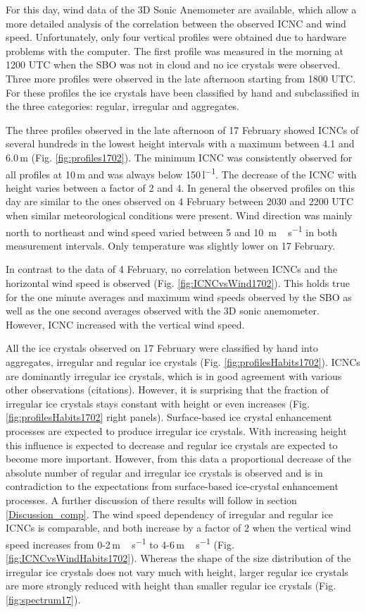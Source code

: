 \documentclass[draft,linenumbers]{agujournal}
\begin{document}
For this day, wind data of the 3D Sonic Anemometer are available, which allow a more detailed analysis of the correlation between the observed ICNC and wind speed. Unfortunately, only four vertical profiles were obtained  due to hardware problems with the computer. The first profile was measured in the morning at 1200 UTC when the SBO was not in cloud and no ice crystals were observed. Three more profiles were observed in the late afternoon starting from 1800 UTC. For these profiles the ice crystals have been classified by hand and subclassified in the three categories: regular, irregular and aggregates.

The three profiles observed in the late afternoon of 17 February showed ICNCs of several hundreds in the lowest height intervals with a maximum between 4.1 and 6.0\,\si{m} (Fig. \ref{fig:profiles1702}). The minimum ICNC was consistently observed for all profiles at 10\,\si{m} and was always below 150\,\si{l^{-1}}. The decrease of the ICNC with height varies between a factor of 2 and 4. In general the observed profiles on this day are similar to the ones observed on 4 February between 2030 and 2200 UTC when similar meteorological conditions were present. Wind direction was mainly north to northeast and wind speed varied between 5 and 10 \,\si{m\,s^{-1}} in both measurement intervals. Only temperature was slightly lower on 17 February.

In contrast to the data of 4 February, no correlation between ICNCs and the horizontal wind speed is observed (Fig. \ref{fig:ICNCvsWind1702}). This holds true for the one minute averages and maximum wind speeds observed by the SBO as well as the one second averages observed with the 3D sonic anemometer. However, ICNC increased with the vertical wind speed. 

All the ice crystals observed on 17 February were classified by hand into aggregates, irregular and regular ice crystals (Fig. \ref{fig:profilesHabits1702}). ICNCs are dominantly irregular ice crystals, which is in good agreement with various other observations (citations). However, it is surprising that the fraction of irregular ice crystals stays constant with height or even increases (Fig. \ref{fig:profilesHabits1702} right panels). Surface-based ice crystal enhancement processes are expected to produce irregular ice crystals. With increasing height this influence is expected to decrease and regular ice crystals are expected to become more important. However, from this data a proportional decrease of the absolute number of regular and irregular ice crystals is observed and is in contradiction to the expectations from surface-based ice-crystal enhancement processes. A further discussion of there results will follow in section \ref{Discussion_comp}. The wind speed dependency of irregular and regular ice ICNCs is comparable, and both increase by a factor of 2 when the vertical wind speed increases from 0-2\,\si{m\,s^{-1}} to 4-6\,\si{m\,s^{-1}} (Fig. \ref{fig:ICNCvsWindHabits1702}). Whereas the shape of the size distribution of the irregular ice crystals does not vary much with height, larger regular ice crystals are more strongly reduced with height than smaller regular ice crystals (Fig. \ref{fig:spectrum17}). 
\end{document}
